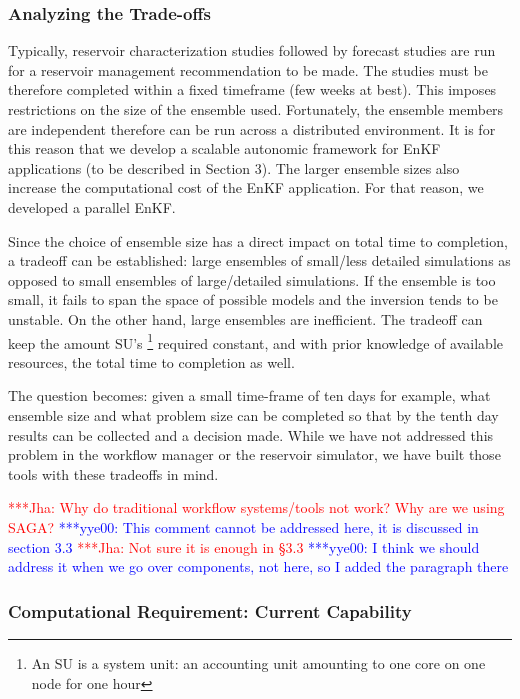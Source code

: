 \documentclass{acm_proc_article-sp}
\newcommand{\jhanote}[1]{ {\textcolor{red} { ***Jha: #1 }}}
\newcommand{\yyenote}[1]{ {\textcolor{blue} { ***yye00: #1 }}}
\newcommand{\jhanote}[1]{}
\newcommand{\yyenote}[1]{}
\begin{document}
\subsubsection{Analyzing the Trade-offs}  

Typically, reservoir characterization studies followed by forecast
studies are run for a reservoir management recommendation to be
made. The studies must be therefore completed within a fixed timeframe
(few weeks at best). This imposes restrictions on the size of the
ensemble used. Fortunately, the ensemble members are independent
therefore can be run across a distributed environment. It is for this
reason that we develop a scalable autonomic framework for EnKF
applications (to be described in Section 3). The larger ensemble sizes
also increase the computational cost of the EnKF application. For that
reason, we developed a parallel EnKF.

Since the choice of ensemble size has a direct impact on total time to
completion, a tradeoff can be established: large ensembles of
small/less detailed simulations as opposed to small ensembles of
large/detailed simulations. If the ensemble is too small, it fails to
span the space of possible models and the inversion tends to
be unstable. On the other hand, large ensembles are
inefficient. The tradeoff can keep the amount SU's
\footnote{An SU is a system unit: an accounting unit
amounting to one core on one node for one hour} required
constant, and with prior knowledge of available resources, the total
time to completion as well.

The question becomes: given a small
time-frame of ten days for example, what ensemble size and what
problem size can be completed so that by the tenth day results can be
collected and a decision made. While we have not addressed this
problem in the workflow manager or the reservoir simulator, we have
built those tools with these tradeoffs in mind.

\jhanote{Why do traditional workflow systems/tools not work? Why are
  we using SAGA?} \yyenote{This comment cannot be addressed here, it
  is discussed in section 3.3} \jhanote{Not sure it is enough in §3.3} \yyenote{I think we should address it when we go over components, not here, so I added the paragraph there}

\subsubsection{Computational Requirement: Current Capability}
\end{document}
